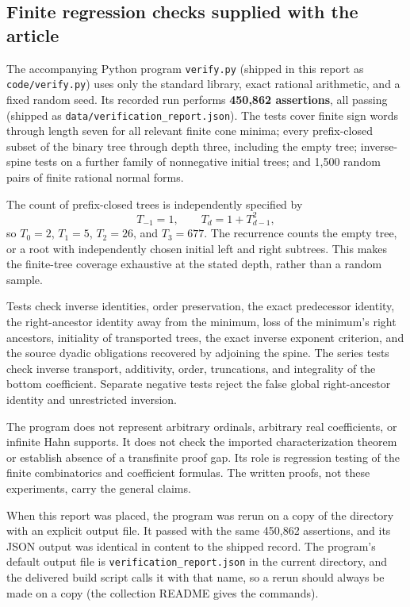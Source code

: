 \documentclass[11pt]{article}
\theoremstyle{definition}
\theoremstyle{remark}
\newcommand{\fn}[1]{\nolinkurl{#1}}
\begin{document}
\subsection{Finite regression checks supplied with the article}
The accompanying Python program \texttt{verify.py} (shipped in this
report as \fn{code/verify.py}) uses only the standard
library, exact rational arithmetic, and a fixed random seed. Its recorded
run performs \textbf{450,862 assertions}, all passing (shipped as
\fn{data/verification_report.json}). The tests cover
finite sign words through length seven for all relevant finite cone
minima; every prefix-closed subset of the binary tree through depth
three, including the empty tree; inverse-spine tests on a further family
of nonnegative initial trees; and 1,500 random pairs of finite rational
normal forms.

The count of prefix-closed trees is independently specified by
\[
 T_{-1}=1,\qquad T_d=1+T_{d-1}^2,
\]
so $T_0=2$, $T_1=5$, $T_2=26$, and $T_3=677$.
The recurrence counts the empty tree, or a root with independently
chosen initial left and right subtrees. This makes the finite-tree
coverage exhaustive at the stated depth, rather than a random sample.

Tests check inverse identities, order preservation, the exact predecessor
identity, the right-ancestor
identity away from the minimum, loss of the minimum's right ancestors,
initiality of transported trees, the exact inverse exponent criterion,
and the source dyadic obligations recovered by adjoining the spine.
The series tests check inverse transport, additivity, order, truncations,
and integrality of the bottom coefficient. Separate negative tests reject
the false global right-ancestor identity and unrestricted inversion.

The program does not represent arbitrary ordinals, arbitrary real
coefficients, or infinite Hahn supports. It does not check the imported
characterization theorem or establish absence of a transfinite proof gap.
Its role is regression testing of the finite combinatorics and coefficient
formulas. The written proofs, not these experiments, carry the general
claims.

When this report was placed, the program was rerun on a copy of the
directory with an explicit output file. It passed with the same 450,862
assertions, and its JSON output was identical in content to the shipped
record. The program's default output file is
\fn{verification_report.json} in the current directory, and the
delivered build script calls it with that name, so a rerun should always
be made on a copy (the collection README gives the commands).
\end{document}
